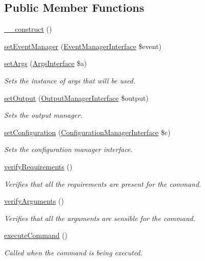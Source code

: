 \subsection*{Public Member Functions}
\begin{DoxyCompactItemize}
\item 
\hyperlink{classGenericCommand_acb09a039b8cb4ee375641e8d1d210d3f}{\-\_\-\-\_\-construct} ()
\item 
\hyperlink{classGenericCommand_acba0758cce439b8aeaff359578ba5d1d}{set\-Event\-Manager} (\hyperlink{interfaceEventManagerInterface}{Event\-Manager\-Interface} \$event)
\item 
\hyperlink{classGenericCommand_ab918b084bc099cb5f8f56db2d6ed4cac}{set\-Args} (\hyperlink{interfaceArgsInterface}{Args\-Interface} \$a)
\begin{DoxyCompactList}\small\item\em Sets the instance of args that will be used. \end{DoxyCompactList}\item 
\hyperlink{classGenericCommand_aee43238a646b83c341ccb27b7d8e0978}{set\-Output} (\hyperlink{interfaceOutputManagerInterface}{Output\-Manager\-Interface} \$output)
\begin{DoxyCompactList}\small\item\em Sets the output manager. \end{DoxyCompactList}\item 
\hyperlink{classGenericCommand_a3677ddac20e11f61766c56820f74555b}{set\-Configuration} (\hyperlink{interfaceConfigurationManagerInterface}{Configuration\-Manager\-Interface} \$c)
\begin{DoxyCompactList}\small\item\em Sets the configuration manager interface. \end{DoxyCompactList}\item 
\hyperlink{classGenericCommand_ab0ce20912e21033169d016310946ccf6}{verify\-Requirements} ()
\begin{DoxyCompactList}\small\item\em Verifies that all the requirements are present for the command. \end{DoxyCompactList}\item 
\hyperlink{classGenericCommand_a3ceec8b56361aeb4b09bee46bb85bac4}{verify\-Arguments} ()
\begin{DoxyCompactList}\small\item\em Verifies that all the arguments are sensible for the command. \end{DoxyCompactList}\item 
\hyperlink{interfaceRouterCommand_ab0eb6b733558c299ebe69e8b0199e9f6}{execute\-Command} ()
\begin{DoxyCompactList}\small\item\em Called when the command is being executed. \end{DoxyCompactList}\end{DoxyCompactItemize}
